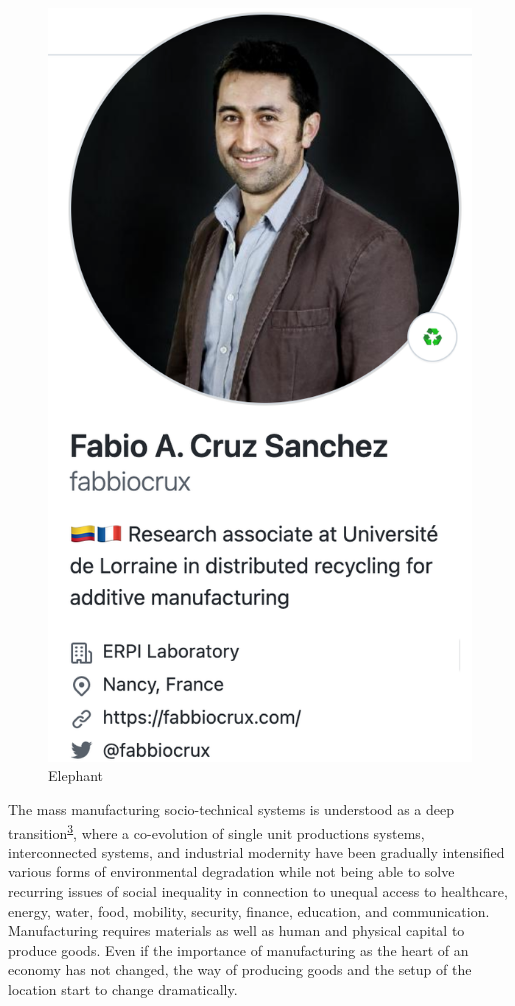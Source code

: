 \documentclass[
  11pt,
  a4paperpaper,
  onecolumn]{article}
\begin{document}
\begin{figure}

\includegraphics{Figures/Fabio.png} \hfill{}

\caption{Elephant}

\end{figure}

The mass manufacturing socio-technical systems is understood as a deep
transition\textsuperscript{\protect\hyperlink{ref-kanger2022}{3}}, where
a co-evolution of single unit productions systems, interconnected
systems, and industrial modernity have been gradually intensified
various forms of environmental degradation while not being able to solve
recurring issues of social inequality in connection to unequal access to
healthcare, energy, water, food, mobility, security, finance, education,
and communication. Manufacturing requires materials as well as human and
physical capital to produce goods. Even if the importance of
manufacturing as the heart of an economy has not changed, the way of
producing goods and the setup of the location start to change
dramatically.
\end{document}
